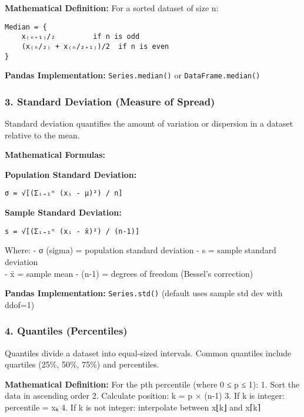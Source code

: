 \documentclass[11pt]{article}
\begin{document}
\textbf{Mathematical Definition:} For a sorted dataset of size n:

\begin{verbatim}
Median = {
    x₍ₙ₊₁₎/₂         if n is odd
    (x₍ₙ/₂₎ + x₍ₙ/₂₊₁₎)/2  if n is even
}
\end{verbatim}

\textbf{Pandas Implementation:} \texttt{Series.median()} or
\texttt{DataFrame.median()}

\subsubsection{\texorpdfstring{3. \textbf{Standard Deviation (Measure of
Spread)}}{3. Standard Deviation (Measure of Spread)}}\label{standard-deviation-measure-of-spread}

Standard deviation quantifies the amount of variation or dispersion in a
dataset relative to the mean.

\textbf{Mathematical Formulas:}

\textbf{Population Standard Deviation:}

\begin{verbatim}
σ = √[(Σᵢ₌₁ⁿ (xᵢ - μ)²) / n]
\end{verbatim}

\textbf{Sample Standard Deviation:}

\begin{verbatim}
s = √[(Σᵢ₌₁ⁿ (xᵢ - x̄)²) / (n-1)]
\end{verbatim}

Where: - σ (sigma) = population standard deviation - s = sample standard
deviation\\
- x̄ = sample mean - (n-1) = degrees of freedom (Bessel's correction)

\textbf{Pandas Implementation:} \texttt{Series.std()} (default uses
sample std dev with ddof=1)

\subsubsection{\texorpdfstring{4. \textbf{Quantiles
(Percentiles)}}{4. Quantiles (Percentiles)}}\label{quantiles-percentiles}

Quantiles divide a dataset into equal-sized intervals. Common quantiles
include quartiles (25\%, 50\%, 75\%) and percentiles.

\textbf{Mathematical Definition:} For the pth percentile (where 0 ≤ p ≤
1): 1. Sort the data in ascending order 2. Calculate position: k = p ×
(n-1) 3. If k is integer: percentile = xₖ 4. If k is not integer:
interpolate between x⌊k⌋ and x⌈k⌉
\end{document}

